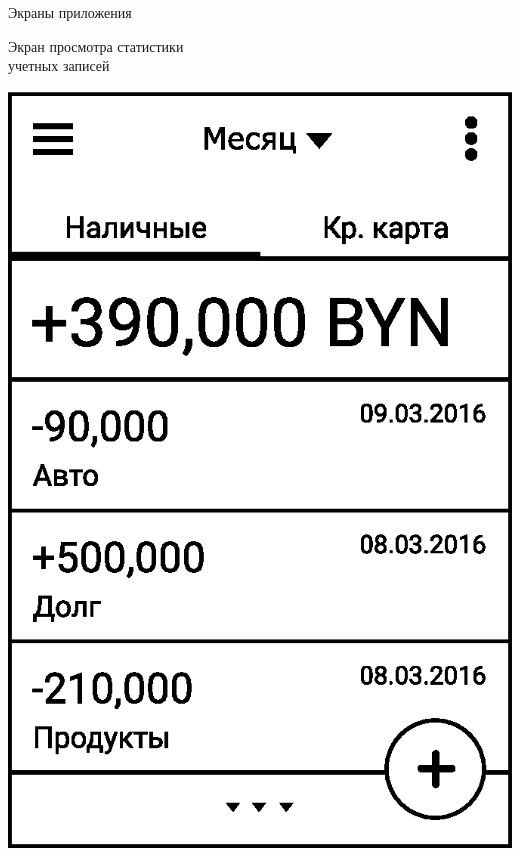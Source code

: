\documentclass[russian,utf8,a1paper,nostitching,simple]{eskdgraph}
\begin{document}
\begin{ESKDdrawing}
  \centering
  {\fontsize{50}{60}\selectfont Экраны приложения}

  \vspace{1.7cm}
  \begin{minipage}{28cm}
    \centering
    {\fontsize{40}{50}\selectfont Экран просмотра статистики \\ учетных записей}

    \vspace{2cm}
    \begin{minipage}{10cm}
      \vspace{4.5cm}
      \raggedleft

      \vspace{11.5cm}
      \raggedleft

      \vspace{2cm}
    \end{minipage}
    \hfill
    \begin{minipage}{7.5cm}
      \centering

      \vspace{1cm}
      \centering
      \includegraphics[width=\linewidth]{fig/ui_activities_balance_text_chrono.eps}


\end{minipage}
\end{minipage}
\end{ESKDdrawing}
\end{document}

